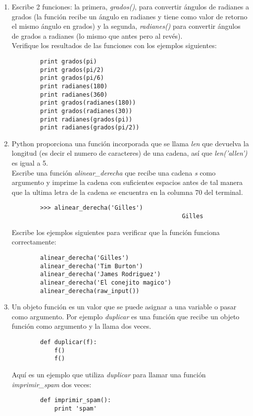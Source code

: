 \documentclass[10pt, twocolumn]{article}
\begin{document}
\begin{enumerate}
		\item Escribe 2 funciones: la primera, \emph{grados()}, para convertir ángulos de radianes a grados (la función recibe un ángulo en radianes y tiene como valor de retorno el mismo ángulo en grados) y la segunda, \emph{radianes()} para convertir ángulos de grados a radianes (lo mismo que antes pero al revés).\\
Verifique los resultados de las funciones con los ejemplos siguientes:
	\begin{verbatim}
		print grados(pi)
		print grados(pi/2)
		print grados(pi/6)
		print radianes(180)
		print radianes(360)
		print grados(radianes(180))
		print grados(radianes(30))
		print radianes(grados(pi))
		print radianes(grados(pi/2))
	\end{verbatim}
	\item Python proporciona una función incorporada que se llama \emph{len} que devuelva la longitud (es decir el numero de caracteres) de una cadena, así que \emph{len('allen')} es igual a 5.\\
	Escribe una función \emph{alinear\_derecha} que recibe una cadena \emph{s} como argumento y imprime la cadena con suficientes espacios antes de tal manera que la ultima letra de la cadena se encuentra en la columna 70 del terminal. 
	\begin{verbatim}
		>>> alinear_derecha('Gilles')
		                                        Gilles
	\end{verbatim}
Escribe los ejemplos siguientes para verificar que la función funciona correctamente:
	\begin{verbatim}
		alinear_derecha('Gilles')
		alinear_derecha('Tim Burton')
		alinear_derecha('James Rodriguez')
		alinear_derecha('El conejito magico')
		alinear_derecha(raw_input())
	\end{verbatim}

\item Un objeto función es un valor que se puede asignar a una variable o pasar como argumento. Por ejemplo \emph{duplicar} es una función que recibe un objeto función como argumento y la llama dos veces.
	\begin{verbatim}
		def duplicar(f):
		    f()
		    f()
	\end{verbatim}
Aquí es un ejemplo que utiliza \emph{duplicar} para llamar una función \emph{imprimir\_spam} dos veces:
	\begin{verbatim}
		def imprimir_spam():
		    print 'spam'
		

\end{verbatim}
\end{enumerate}
\end{document}
